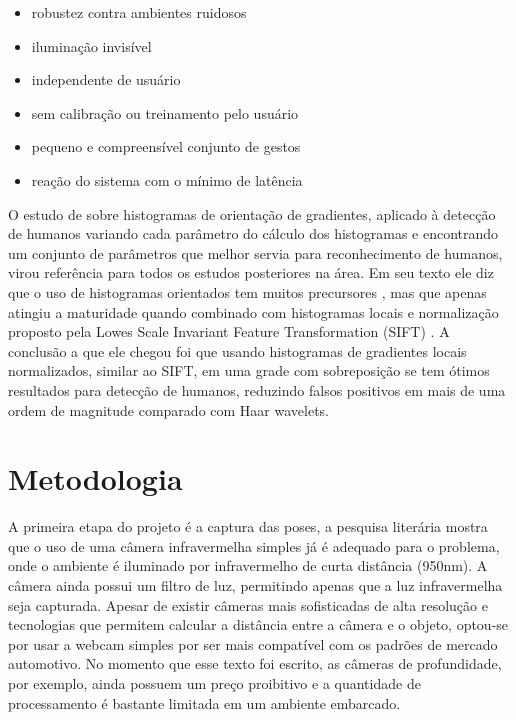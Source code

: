 \begin{itemize}
\item robustez contra ambientes ruidosos
\item iluminação invisível
\item independente de usuário
\item sem calibração ou treinamento pelo usuário
\item pequeno e compreensível conjunto de gestos
\item reação do sistema com o mínimo de latência
\end{itemize}

O estudo de  sobre histogramas de orientação de gradientes, aplicado à detecção de humanos variando cada parâmetro do cálculo dos histogramas e encontrando um conjunto de parâmetros que melhor servia para reconhecimento de humanos, virou referência para todos os estudos posteriores na área. Em seu texto ele diz que o uso de histogramas orientados tem muitos precursores \cite{freeman1995orientation, freeman1996computer}, mas que apenas atingiu a maturidade quando combinado com histogramas locais e normalização proposto pela Lowes Scale Invariant Feature Transformation (SIFT) \cite{lowe2004distinctive}. A conclusão a que ele chegou foi que usando histogramas de gradientes locais normalizados, similar ao SIFT, em uma grade com sobreposição se tem ótimos resultados para detecção de humanos, reduzindo falsos positivos em mais de uma ordem de magnitude comparado com Haar wavelets.

\section{Metodologia}

A primeira etapa do projeto é a captura das poses, a pesquisa literária mostra \cite{zobl2004gesture, akyol2000gesture} que o uso de uma câmera infravermelha simples já é adequado para o problema, onde o ambiente é iluminado por infravermelho de curta distância (950nm). A câmera ainda possui um filtro de luz, permitindo apenas que a luz infravermelha seja capturada. Apesar de existir câmeras mais sofisticadas de alta resolução e tecnologias que permitem calcular a distância entre a câmera e o objeto, optou-se por usar a webcam simples por ser mais compatível com os padrões de mercado automotivo. No momento que esse texto foi escrito, as câmeras de profundidade, por exemplo, ainda possuem um preço proibitivo e a quantidade de processamento é bastante limitada em um ambiente embarcado.

